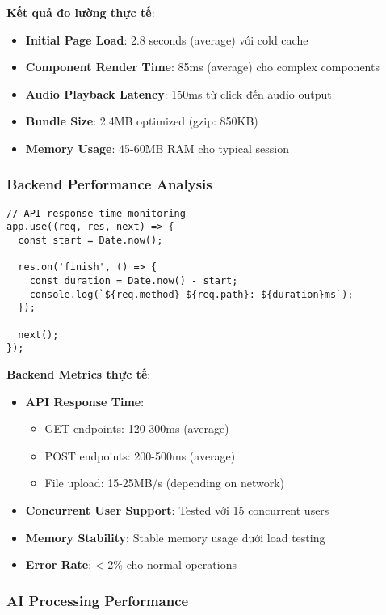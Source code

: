 \documentclass[12pt,a4paper]{article}
\begin{document}
\textbf{Kết quả đo lường thực tế}:
\begin{itemize}
\item \textbf{Initial Page Load}: 2.8 seconds (average) với cold cache
\item \textbf{Component Render Time}: 85ms (average) cho complex components
\item \textbf{Audio Playback Latency}: 150ms từ click đến audio output
\item \textbf{Bundle Size}: 2.4MB optimized (gzip: 850KB)
\item \textbf{Memory Usage}: 45-60MB RAM cho typical session
\end{itemize}

\subsubsection{Backend Performance Analysis}

\begin{lstlisting}[caption={API response time monitoring}]
// API response time monitoring
app.use((req, res, next) => {
  const start = Date.now();
  
  res.on('finish', () => {
    const duration = Date.now() - start;
    console.log(`${req.method} ${req.path}: ${duration}ms`);
  });
  
  next();
});
\end{lstlisting}

\textbf{Backend Metrics thực tế}:
\begin{itemize}
\item \textbf{API Response Time}: 
  \begin{itemize}
  \item GET endpoints: 120-300ms (average)
  \item POST endpoints: 200-500ms (average)
  \item File upload: 15-25MB/s (depending on network)
  \end{itemize}
\item \textbf{Concurrent User Support}: Tested với 15 concurrent users
\item \textbf{Memory Stability}: Stable memory usage dưới load testing
\item \textbf{Error Rate}: < 2\% cho normal operations
\end{itemize}

\subsubsection{AI Processing Performance}
\end{document}
